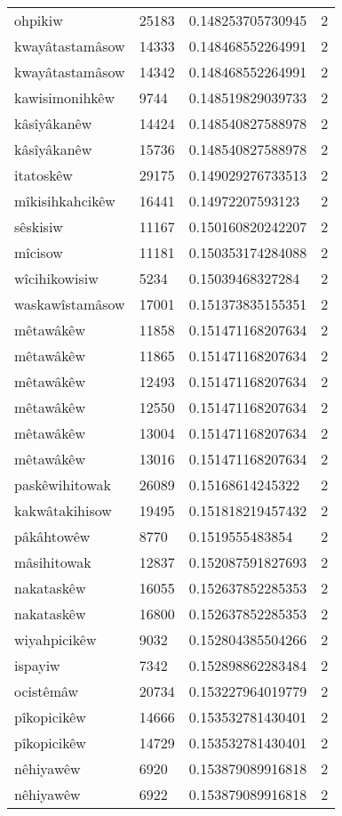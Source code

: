 \begin{longtable}{llll}
ohpikiw & 25183 & 0.148253705730945 & 2 \\
kwayâtastamâsow & 14333 & 0.148468552264991 & 2 \\
kwayâtastamâsow & 14342 & 0.148468552264991 & 2 \\
kawisimonihkêw & 9744 & 0.148519829039733 & 2 \\
kâsîyâkanêw & 14424 & 0.148540827588978 & 2 \\
kâsîyâkanêw & 15736 & 0.148540827588978 & 2 \\
itatoskêw & 29175 & 0.149029276733513 & 2 \\
mîkisihkahcikêw & 16441 & 0.14972207593123 & 2 \\
sêskisiw & 11167 & 0.150160820242207 & 2 \\
mîcisow & 11181 & 0.150353174284088 & 2 \\
wîcihikowisiw & 5234 & 0.15039468327284 & 2 \\
waskawîstamâsow & 17001 & 0.151373835155351 & 2 \\
mêtawâkêw & 11858 & 0.151471168207634 & 2 \\
mêtawâkêw & 11865 & 0.151471168207634 & 2 \\
mêtawâkêw & 12493 & 0.151471168207634 & 2 \\
mêtawâkêw & 12550 & 0.151471168207634 & 2 \\
mêtawâkêw & 13004 & 0.151471168207634 & 2 \\
mêtawâkêw & 13016 & 0.151471168207634 & 2 \\
paskêwihitowak & 26089 & 0.15168614245322 & 2 \\
kakwâtakihisow & 19495 & 0.151818219457432 & 2 \\
pâkâhtowêw & 8770 & 0.1519555483854 & 2 \\
mâsihitowak & 12837 & 0.152087591827693 & 2 \\
nakataskêw & 16055 & 0.152637852285353 & 2 \\
nakataskêw & 16800 & 0.152637852285353 & 2 \\
wiyahpicikêw & 9032 & 0.152804385504266 & 2 \\
ispayiw & 7342 & 0.152898862283484 & 2 \\
ocistêmâw & 20734 & 0.153227964019779 & 2 \\
pîkopicikêw & 14666 & 0.153532781430401 & 2 \\
pîkopicikêw & 14729 & 0.153532781430401 & 2 \\
nêhiyawêw & 6920 & 0.153879089916818 & 2 \\
nêhiyawêw & 6922 & 0.153879089916818 & 2 \\

\end{longtable}
